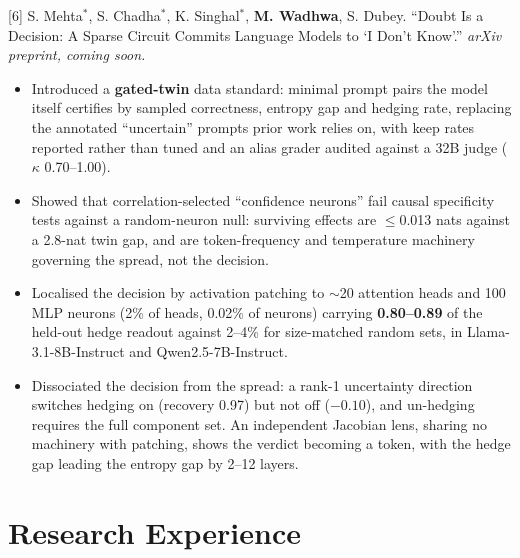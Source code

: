 \documentclass[letterpaper,10pt]{article}
\begin{document}
\vspace{3pt}
\small{[6] S. Mehta$^{*}$, S. Chadha$^{*}$, K. Singhal$^{*}$, \textbf{M. Wadhwa}, S. Dubey. ``Doubt Is a Decision: A Sparse Circuit Commits Language Models to `I Don't Know'.'' \textit{arXiv preprint, coming soon.}}
\begin{itemize}[leftmargin=0.3in, itemsep=1pt, topsep=2pt, parsep=0pt]
  \item \small Introduced a \textbf{gated-twin} data standard: minimal prompt pairs the model itself certifies by sampled correctness, entropy gap and hedging rate, replacing the annotated ``uncertain'' prompts prior work relies on, with keep rates reported rather than tuned and an alias grader audited against a 32B judge ($\kappa$ 0.70--1.00).
  \item \small Showed that correlation-selected ``confidence neurons'' fail causal specificity tests against a random-neuron null: surviving effects are $\leq$0.013 nats against a 2.8-nat twin gap, and are token-frequency and temperature machinery governing the spread, not the decision.
  \item \small Localised the decision by activation patching to $\sim$20 attention heads and 100 MLP neurons (2\% of heads, 0.02\% of neurons) carrying \textbf{0.80--0.89} of the held-out hedge readout against 2--4\% for size-matched random sets, in Llama-3.1-8B-Instruct and Qwen2.5-7B-Instruct.
  \item \small Dissociated the decision from the spread: a rank-1 uncertainty direction switches hedging on (recovery 0.97) but not off ($-0.10$), and un-hedging requires the full component set. An independent Jacobian lens, sharing no machinery with patching, shows the verdict becoming a token, with the hedge gap leading the entropy gap by 2--12 layers.
\end{itemize}



\section{Research Experience}
\end{document}
